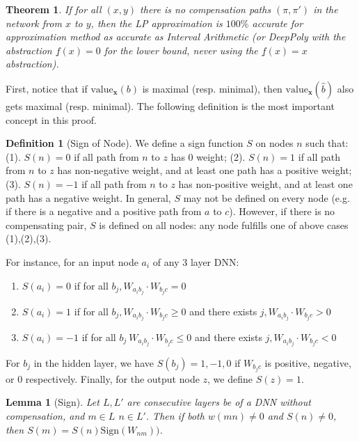 \documentclass[]{article}
\newtheorem{theorem}{Theorem}
\newtheorem{lemma}{Lemma}
\theoremstyle{definition}
\newtheorem{definition}{Definition}
\newcommand{\Val}{\mathrm{value}}
\begin{document}
\begin{theorem}
	\label{th1}
	If for all $(x,y)$ there is no compensation paths $(\pi,\pi')$ 
	in the network from $x$ to $y$, then the LP approximation is 
	$100\%$ accurate for approximation method as accurate as Interval Arithmetic (or DeepPoly with the abstraction $\underline{f}(x) = 0$ for the lower bound, never using the $\underline{f}(x) = x$ abstraction). 
\end{theorem}



First, notice that if $\Val_{\boldsymbol{x}}(b)$ is maximal (resp. minimal), 
then $\Val_{\boldsymbol{x}}(\hat{b})$ also gets maximal (resp. minimal).
The following definition is the most important concept in this proof.

\begin{definition}[Sign of Node]\label{sign_of_nodes}
	We define a sign function $S$ on nodes $n$ such that: 	(1). $S(n)=0$ if all path from $n$ to $z$ has 0 weight; (2). $S(n)=1$ if all path from $n$ to $z$ has non-negative weight, and at least one path has a positive weight; (3). $S(n)=-1$ if all path from $n$ to $z$ has non-positive weight, and at least one path has a negative weight. 
	In general, $S$ may not be defined on every node (e.g. if there is a negative and a positive path from $a$ to $c$). However, if there is no compensating pair, $S$ is defined on all nodes: any node fulfills one of above cases (1),(2),(3).
	
	
	For instance, for an input node $a_i$ of any 3 layer DNN:
	\begin{enumerate}
		\item  $S(a_i)=0$ if 
		for all $b_j, W_{a_i b_j}\cdot W_{b_j c} = 0$
		
		
		\item  $S(a_i)=1$ if for all $b_j, W_{a_i b_j}\cdot W_{b_j c} \geq 0$ and there exists 
		$j, W_{a_i b_j}\cdot W_{b_j c} > 0$
		
		\item $S(a_i)=-1$ if for all $b_j\ W_{a_i b_j}\cdot W_{b_j c} \leq 0$ and there exists 
		$j, W_{a_i b_j}\cdot W_{b_j c} < 0$ 
	\end{enumerate}
	
	For $b_j$ in the hidden layer, we have $S(b_j)=1,-1,0$ if $W_{b_j c}$ is positive, negative, or 0 respectively. Finally, for the output node $z$, we define $S(z)=1$.
\end{definition}


\begin{lemma}[Sign]
	\label{lemma1}
	Let $L,L'$  are consecutive layers be of a DNN without compensation, and $m\in L$ $n\in L'$. 
	Then if both 
	$w(m n) \neq 0$ and $S(n) \neq 0$, then 
	$S(m)=S(n)\mathrm{Sign}(W_{n m}))$.
\end{lemma}
\end{document}
